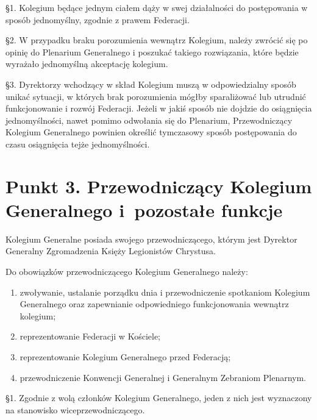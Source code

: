 



 \S{}1. Kolegium będące jednym ciałem dąży w swej działalności do postępowania w sposób jednomyślny, zgodnie z prawem Federacji.


\S{}2. W przypadku braku porozumienia wewnątrz Kolegium, należy zwrócić się po opinię do Plenarium Generalnego i poszukać takiego rozwiązania, które będzie wyrażało jednomyślną akceptację kolegium.


\S{}3. Dyrektorzy wchodzący w skład Kolegium muszą w odpowiedzialny sposób unikać sytuacji, w których brak porozumienia mógłby sparaliżować lub utrudnić funkcjonowanie i rozwój Federacji. Jeżeli w jakiś sposób nie dojdzie do osiągnięcia jednomyślności, nawet pomimo odwołania się do Plenarium, Przewodniczący Kolegium Generalnego powinien określić tymczasowy sposób postępowania do czasu osiągnięcia tejże jednomyślności.
 
\section{Punkt 3. Przewodniczący Kolegium Generalnego \mbox{i pozostałe} funkcje}
 
 Kolegium Generalne posiada swojego przewodniczącego, którym jest Dyrektor Generalny Zgromadzenia Księży Legionistów Chrystusa.
 


 Do obowiązków przewodniczącego Kolegium Generalnego należy:


\begin{enumerate}


\item zwoływanie, ustalanie porządku dnia i przewodniczenie spotkaniom Kolegium Generalnego oraz zapewnianie odpowiedniego funkcjonowania wewnątrz kolegium;


\item reprezentowanie Federacji w Kościele;


\item reprezentowanie Kolegium Generalnego przed Federacją;


\item przewodniczenie Konwencji Generalnej i Generalnym Zebraniom Plenarnym.


\end{enumerate}


\filbreak{}
 \S{}1. Zgodnie z wolą członków Kolegium Generalnego, jeden z nich jest wyznaczony na stanowisko wiceprzewodniczącego.


